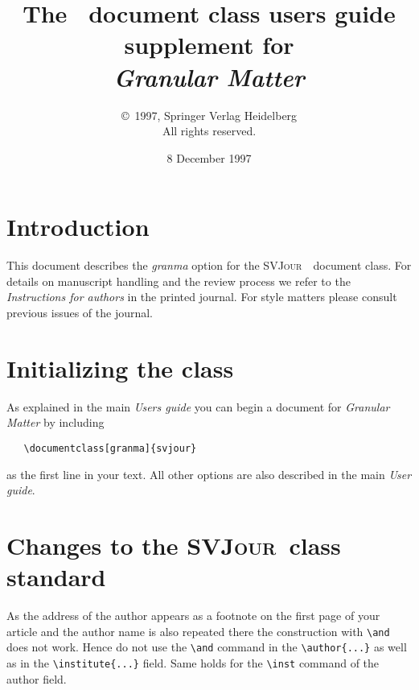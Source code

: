 \documentclass[draft]{ltxguide}[1995/11/28]
\title{The \SJour\ document class users guide\\supplement for\\
\textit{Granular Matter}}
\author{\copyright~1997, Springer Verlag Heidelberg\\
   All rights reserved.}
\date{8 December 1997}
\newcommand{\SJour}{\textsc{SVJour}}
\begin{document}
\maketitle

\section{Introduction}
\label{sec:intro}
This document describes the \textit{granma} option for the
\SJour\ \LaTeXe\ document class. For details on
manuscript handling and the review process we refer to the
\emph{Instructions for authors} in the printed journal. For style
matters please consult previous issues of the journal.

\section{Initializing the class}
\label{sec:opt}

As explained in the main \emph{Users guide} you can
begin a document for \emph{Granular Matter} by including
\begin{verbatim}
   \documentclass[granma]{svjour}
\end{verbatim}
as the first line in your text. All other options are also described in
the main \emph{User guide}.

\section{Changes to the \SJour\ class standard}

As the address of the author appears as a footnote on the first page
of your article and the author name is also repeated there the
construction with \verb|\and| does not work. Hence do not use the
\verb|\and| command in the \verb|\author{...}| as well as in the
\verb|\institute{...}| field. Same holds for the \verb|\inst| command
of the author field.
\end{document}
